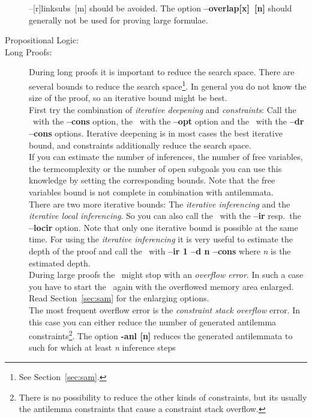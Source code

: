 \begin{description}
{{      --[r]linksubs~[m]} should be avoided. The option {\bf
      --overlap[x]~[n]} should generally not be used for proving large
      formulae.} 
\item[Propositional Logic:]
     {}
\item[Long Proofs:]
     {During long proofs it is important to reduce the search space.
      There are several bounds to reduce the search space\footnote{See
      Section~\ref{sec:sam}.}. In general you do not know the size of
      the proof, so an iterative bound might be best.\\
      First try the combination of {\it iterative deepening\/} and
      {\it constraints\/}: Call the \inw\ with the {\bf --cons}
      option, the \wasm\ with the {\bf --opt} option and the \sam\
      with the {\bf --dr --cons} options. Iterative deepening
      is in most cases the best iterative bound, and 
      constraints additionally reduce the search space.\\
      If you can estimate the number of inferences, the number of free
      variables, the termcomplexity or the number of open subgoals you
      can use this knowledge by setting the corresponding bounds. Note
      that the free variables bound is not complete in combination
      with antilemmata.\\ 
      There are two more iterative bounds: The {\it iterative
      inferencing\/} and the {\it iterative local
      inferencing\/}. So you can also call the \SAM\
      with the {\bf --ir} resp.\ the {\bf --locir} option. Note that
      only one iterative bound is possible at the same time. For using
      the {\it iterative inferencing\/} it is very useful to estimate
      the depth of the proof and call the \SAM\ with {\bf --ir 1 --d n 
      --cons} where {\it n\/} is the estimated depth.\\
      During large proofs the \sam\ might stop with an {\it overflow
      error\/}. In such a case you have to start the \SAM\ again with
      the overflowed memory area enlarged. Read Section~\ref{sec:sam}
      for the enlarging options.\\
      The most frequent overflow error is the {\it constraint
      stack overflow\/} error. In this case you can either reduce
      the number of 
      generated antilemma constraints\footnote{There is no possibility
      to reduce the other kinds of constraints, but its usually the
      antilemma constraints that cause a constraint stack
      overflow.}.
      The option {\bf -anl [n]} reduces the generated
      antilemmata to such for which at least {\it n\/} inference steps
}
\end{description}

